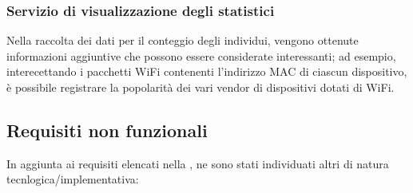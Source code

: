\subsubsection{Servizio di visualizzazione degli statistici}

Nella raccolta dei dati per il conteggio degli individui, vengono ottenute informazioni aggiuntive che possono essere considerate interessanti;
ad esempio, interecettando i pacchetti WiFi contenenti l'indirizzo MAC di ciascun dispositivo, è possibile registrare la popolarità dei vari vendor di dispositivi dotati di WiFi.

\subsection{Requisiti non funzionali}

In aggiunta ai requisiti elencati nella , ne sono stati individuati altri di natura tecnlogica/implementativa:

